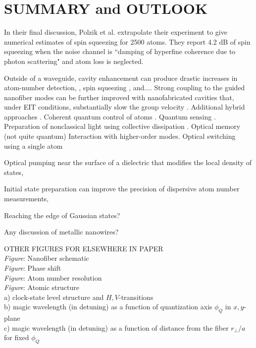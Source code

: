 \documentclass[preprint,aps,pra,onecolumn]{revtex4-1} %
\newcommand{\comment}[1]{{\color{Maroon} #1}}
\begin{document}
\section{SUMMARY and OUTLOOK}

 
In their final discussion, Polzik et al. \cite{beguin_generation_2014} extrapolate their experiment to give numerical estimates of spin squeezing for 2500 atoms.  
They report 4.2 dB of spin squeezing when the noise channel is ``damping of hyperfine coherence due to photon scattering" and atom loss is neglected. 


Outside of a waveguide, cavity enhancement can produce drastic increases in atom-number detection, \cite{zhang_collective_2012}, spin squeezing \cite{bohnet_reduced_2014}, and....   
Strong coupling to the guided nanofiber modes can be further improved with nanofabricated cavities that, under EIT conditions, substantially slow the group velocity \cite{le_kien_intracavity_2009,wuttke_nanofiber_2012,nayak_optical_2014}.  Additional hybrid approaches \cite{hafezi_atomic_2012, yalla_cavity_2014}.  Coherent quantum control of atoms \cite{smith_quantum_2013-1}.  
Quantum sensing \cite{kumar_autler-townes_2015}.  Preparation of nonclassical light using collective dissipation \cite{gonzalez-tudela_deterministic_2015}.  
Optical memory (not quite quantum) \cite{sayrin_storage_2015, gouraud_demonstration_2015} Interaction with higher-order modes.  Optical switching using a single atom \cite{oshea_fiber-optical_2013} 

Optical pumping near the surface of a dielectric that modifies the local density of states, 

Initial state preparation can improve the precision of dispersive atom number measurements, 

Reaching the edge of Gaussian states?

\cite{scheel_directional_2015}
\comment{Any discussion of metallic nanowires?}

\comment{
OTHER FIGURES FOR ELSEWHERE IN PAPER \\
\emph{Figure}: Nanofiber schematic \\
\emph{Figure}: Phase shift \\
\emph{Figure}: Atom number resolution \\
\emph{Figure}: Atomic structure \\
a) clock-state level structure and $H,V$-transitions \\
b) magic wavelength (in detuning) as a function of quantization axis $\phi_Q$ in $x,y$-plane \\
c) magic wavelength (in detuning) as a function of distance from the fiber $r_\perp/a$ for fixed $\phi_Q$ 

}
\end{document}
